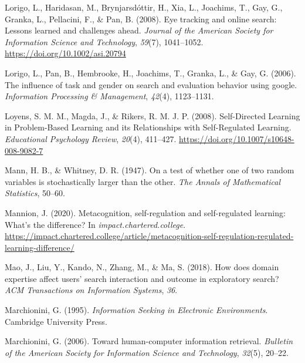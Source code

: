 \documentclass[letterpaper, nobind]{templates/ociamthesis}
\newlength{\cslhangindent}
\newenvironment{CSLReferences}[2] %
 {%
  \setlength{\parindent}{0pt}
  \ifodd #1
  \let\oldpar\par
  \def\par{\hangindent=\cslhangindent\oldpar}
  \fi
  \setlength{\parskip}{1mm}
  \setlength{\baselineskip}{6mm}
 }%
 {}
\begin{document}
\begin{CSLReferences}{1}{0}
\leavevmode{}%
Lorigo, L., Haridasan, M., Brynjarsdóttir, H., Xia, L., Joachims, T., Gay, G., Granka, L., Pellacini, F., \& Pan, B. (2008). Eye tracking and online search: {Lessons} learned and challenges ahead. \emph{Journal of the American Society for Information Science and Technology}, \emph{59}(7), 1041--1052. \url{https://doi.org/10.1002/asi.20794}

\leavevmode{}%
Lorigo, L., Pan, B., Hembrooke, H., Joachims, T., Granka, L., \& Gay, G. (2006). The influence of task and gender on search and evaluation behavior using google. \emph{Information Processing \& Management}, \emph{42}(4), 1123--1131.

\leavevmode{}%
Loyens, S. M. M., Magda, J., \& Rikers, R. M. J. P. (2008). Self-{Directed Learning} in {Problem}-{Based Learning} and its {Relationships} with {Self}-{Regulated Learning}. \emph{Educational Psychology Review}, \emph{20}(4), 411--427. \url{https://doi.org/10.1007/s10648-008-9082-7}

\leavevmode{}%
Mann, H. B., \& Whitney, D. R. (1947). On a test of whether one of two random variables is stochastically larger than the other. \emph{The Annals of Mathematical Statistics}, 50--60.

\leavevmode{}%
Mannion, J. (2020). Metacognition, self-regulation and self-regulated learning: What's the difference? In \emph{impact.chartered.college}. \url{https://impact.chartered.college/article/metacognition-self-regulation-regulated-learning-difference/}

\leavevmode{}%
Mao, J., Liu, Y., Kando, N., Zhang, M., \& Ma, S. (2018). How does domain expertise affect users' search interaction and outcome in exploratory search? \emph{ACM Transactions on Information Systems}, \emph{36}.

\leavevmode{}%
Marchionini, G. (1995). \emph{Information {Seeking} in {Electronic Environments}}. {Cambridge University Press}.

\leavevmode{}%
Marchionini, G. (2006). Toward human-computer information retrieval. \emph{Bulletin of the American Society for Information Science and Technology}, \emph{32}(5), 20--22.


\end{CSLReferences}
\end{document}
